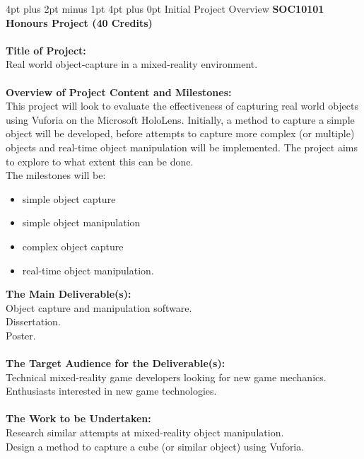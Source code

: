 \documentclass[12pt,a4paper,oneside]{article}
\makeatletter
\renewcommand\section{\@startsection {section}{1}{0mm} %
                               {4pt plus 2pt minus 1pt} %
                               {4pt plus 0pt} %
                               {\Large\bfseries}}
\makeatother
\begin{document}
\newpage
\begin{appendices}
\section{Initial Project Overview}
\textbf{SOC10101 Honours Project (40 Credits)} \\ \\
\textbf{Title of Project:} \\
Real world object-capture in a mixed-reality environment. \\ \\
\textbf{Overview of Project Content and Milestones:} \\
This project will look to evaluate the effectiveness of capturing real world objects using Vuforia on the Microsoft HoloLens. Initially, a method to capture a simple object will be developed, before attempts to capture more complex (or multiple) objects and real-time object manipulation will be implemented. The project aims to explore to what extent this can be done. \\
The milestones will be: 
\begin{itemize}\itemsep0pt
	\item simple object capture
	\item simple object manipulation
	\item complex object capture
	\item real-time object manipulation.
\end{itemize}
\textbf{The Main Deliverable(s):} \\
Object capture and manipulation software. \\
Dissertation. \\
Poster. \\ \\
\textbf{The Target Audience for the Deliverable(s):} \\
Technical mixed-reality game developers looking for new game mechanics. \\
Enthusiasts interested in new game technologies. \\ \\
\textbf{The Work to be Undertaken:} \\
Research similar attempts at mixed-reality object manipulation. \\
Design a method to capture a cube (or similar object) using Vuforia. \\

\end{appendices}
\end{document}
